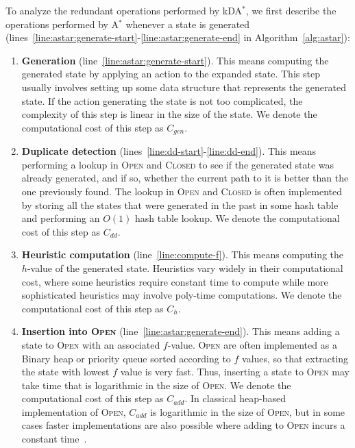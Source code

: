 \documentclass{aicom2e}
\newcommand{\astar}{A$^*$}
\newcommand{\kxastar}{kDA$^*$}
\newcommand{\open}{\textsc{Open}}
\newcommand{\closed}{\textsc{Closed}}
\begin{document}
To analyze the redundant operations performed by \kxastar{}, we first describe
the operations performed by \astar{} whenever a state is generated
(lines~\ref{line:astar:generate-start}-\ref{line:astar:generate-end} in
Algorithm~\ref{alg:astar}):
\begin{enumerate}

\item {\bf Generation}  (line~\ref{line:astar:generate-start}).
This means computing the generated state by applying an action to the expanded
state. This step usually involves setting up some data structure that
represents the generated state. If the action generating the state is not too
complicated, the complexity of this step is linear in the size of the state. We
denote the computational cost of this step as $C_{gen}$.


\item {\bf Duplicate detection}  (lines~\ref{line:dd-start}-\ref{line:dd-end}).
This means performing a lookup in \open{} and \closed{} to see if the generated
state was already generated, and if so, whether the current path to it is
better than the one previously found. The lookup in \open{} and \closed{} is
often implemented by storing all the states that were generated in the past in
some hash table and performing an $O(1)$ hash table lookup. We denote the
computational cost of this step as $C_{dd}$.

\item {\bf Heuristic computation} (line~\ref{line:compute-f}). This means computing
the $h$-value of the generated state. Heuristics vary widely in their
computational cost, where some heuristics require constant time to compute
while more sophisticated heuristics may involve poly-time computations. We
denote the computational cost of this step as $C_{h}$.

\item {\bf Insertion into \open{}}  (line~\ref{line:astar:generate-end}). This means
adding a state to \open{} with an associated $f$-value. \open{} are often
implemented as a Binary heap or priority queue sorted according to $f$ values,
so that extracting the state with lowest $f$ value is very fast. Thus,
inserting a state to \open{} may take time that is logarithmic in the size of
\open{}. We denote the computational cost of this step as $C_{add}$. In
classical heap-based implementation of \open{}, $C_{add}$ is logarithmic in the
size of \open{}, but in some cases faster implementations are also possible
where adding to \open{} incurs a constant time~\cite{GILON2016,BurnsHLR12}.
\end{enumerate}
\end{document}
